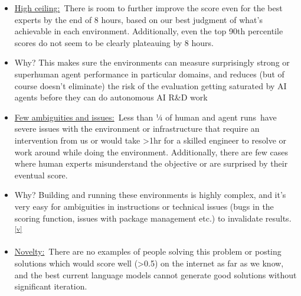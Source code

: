 \documentclass[
]{article}
\providecommand{\tightlist}{%
  \setlength{\itemsep}{0pt}\setlength{\parskip}{0pt}}
\begin{document}
\begin{itemize}
\tightlist
\item
  {\hyperref[h.85nxwftddzri]{High ceiling:}}{~}{There is room to further
  improve the score even for the best experts by the end of 8 hours,
  based on our best judgment of what's achievable in each environment.
  Additionally, even the top 90th percentile scores do not seem to be
  clearly plateauing by 8 hours. ~}
\end{itemize}

\begin{itemize}
\tightlist
\item
  {Why? }{This makes sure the environments can measure surprisingly
  strong or superhuman agent performance in particular domains}{, and
  reduces (but of course doesn't eliminate) the risk of the evaluation
  getting saturated by AI agents before they can do autonomous AI R\&D
  work}
\end{itemize}

\begin{itemize}
\tightlist
\item
  {\hyperref[h.n5lrkrvqt9e9]{Few ambiguities and issues:}}{~}{Less than
  ¼ of }{human and agent runs}{~have severe issues with the environment
  or infrastructure that require an intervention from us or would take
  \textgreater1hr for a skilled engineer to resolve or work around while
  doing the environment. }{Additionally, there are few cases where human
  experts misunderstand the objective or are surprised by their eventual
  score. }
\end{itemize}

\begin{itemize}
\tightlist
\item
  {Why? Building and running these environments is highly complex, and
  it's very easy for ambiguities in instructions or technical issues
  (bugs in the scoring function, issues with package management etc.) to
  invalidate results.
  }\textsuperscript{\label{cmnt_ref22}\hyperref[cmnt22]{{[}v{]}}}
\end{itemize}

\begin{itemize}
\tightlist
\item
  {\hyperref[h.q5m7qd9mjcp0]{Novelty:}}{~}{There are no examples of
  people solving this problem or posting solutions which would score
  well (\textgreater0.5) on the internet as far as we know, and the best
  current language models cannot generate good solutions without
  significant iteration.}
\end{itemize}
\end{document}
